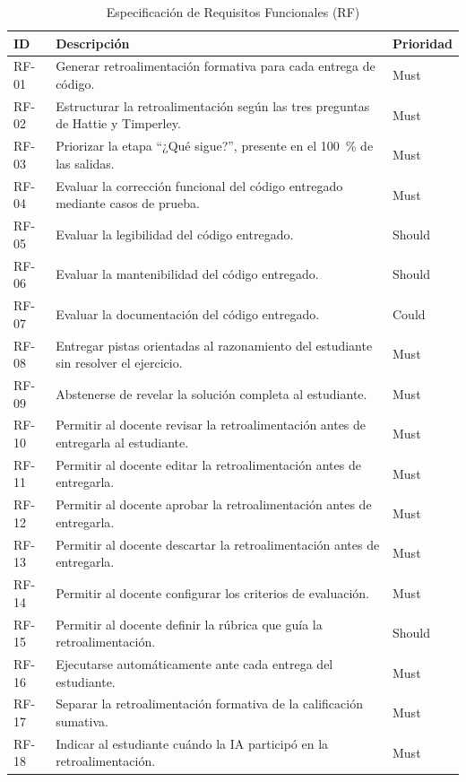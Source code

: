 \documentclass[letterpaper, 10 pt, conference]{ieeeconf}
\begin{document}
\begin{table}[ht]
	\centering
	\caption{Especificación de Requisitos Funcionales (RF)}
	\label{tab:req_funcional}
	\begin{tabular}{lp{5.0cm}l}
		\hline
		\textbf{ID} & \textbf{Descripción} & \textbf{Prioridad} \\
		\hline
		RF-01 & Generar retroalimentación formativa para cada entrega de código. & Must \\
		RF-02 & Estructurar la retroalimentación según las tres preguntas de Hattie y Timperley. & Must \\
		RF-03 & Priorizar la etapa “¿Qué sigue?”, presente en el 100~\% de las salidas. & Must \\
		RF-04 & Evaluar la corrección funcional del código entregado mediante casos de prueba. & Must \\
		RF-05 & Evaluar la legibilidad del código entregado. & Should \\
		RF-06 & Evaluar la mantenibilidad del código entregado. & Should \\
		RF-07 & Evaluar la documentación del código entregado. & Could \\
		RF-08 & Entregar pistas orientadas al razonamiento del estudiante sin resolver el ejercicio. & Must \\
		RF-09 & Abstenerse de revelar la solución completa al estudiante. & Must \\
		RF-10 & Permitir al docente revisar la retroalimentación antes de entregarla al estudiante. & Must \\
		RF-11 & Permitir al docente editar la retroalimentación antes de entregarla. & Must \\
		RF-12 & Permitir al docente aprobar la retroalimentación antes de entregarla. & Must \\
		RF-13 & Permitir al docente descartar la retroalimentación antes de entregarla. & Must \\
		RF-14 & Permitir al docente configurar los criterios de evaluación. & Must \\
		RF-15 & Permitir al docente definir la rúbrica que guía la retroalimentación. & Should \\
		RF-16 & Ejecutarse automáticamente ante cada entrega del estudiante. & Must \\
		RF-17 & Separar la retroalimentación formativa de la calificación sumativa. & Must \\
		RF-18 & Indicar al estudiante cuándo la IA participó en la retroalimentación. & Must \\

\end{tabular}
\end{table}
\end{document}
